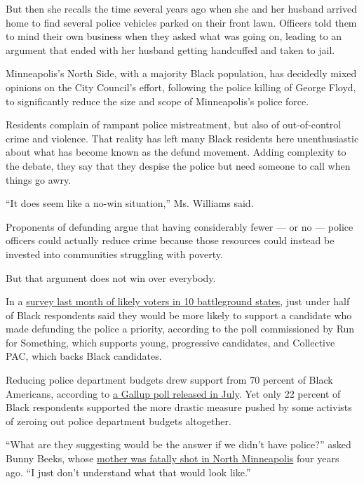 But then she recalls the time several years ago when she and her husband
arrived home to find several police vehicles parked on their front lawn.
Officers told them to mind their own business when they asked what was
going on, leading to an argument that ended with her husband getting
handcuffed and taken to jail.

Minneapolis's North Side, with a majority Black population, has
decidedly mixed opinions on the City Council's effort, following the
police killing of George Floyd, to significantly reduce the size and
scope of Minneapolis's police force.

Residents complain of rampant police mistreatment, but also of
out-of-control crime and violence. That reality has left many Black
residents here unenthusiastic about what has become known as the defund
movement. Adding complexity to the debate, they say that they despise
the police but need someone to call when things go awry.

``It does seem like a no-win situation,'' Ms. Williams said.

Proponents of defunding argue that having considerably fewer --- or no
--- police officers could actually reduce crime because those resources
could instead be invested into communities struggling with poverty.

But that argument does not win over everybody.

In a
\href{https://runforsomething.net/wp-content/uploads/2020/07/PoliceReform_deck-d8.pdf}{survey
last month of likely voters in 10 battleground states}, just under half
of Black respondents said they would be more likely to support a
candidate who made defunding the police a priority, according to the
poll commissioned by Run for Something, which supports young,
progressive candidates, and Collective PAC, which backs Black
candidates.

Reducing police department budgets drew support from 70 percent of Black
Americans, according to
\href{https://news.gallup.com/poll/315962/americans-say-policing-needs-major-changes.aspx}{a
Gallup poll released in July}. Yet only 22 percent of Black respondents
supported the more drastic measure pushed by some activists of zeroing
out police department budgets altogether.

``What are they suggesting would be the answer if we didn't have
police?'' asked Bunny Beeks, whose
\href{https://www.mprnews.org/story/2017/12/19/random-bullet-killed-birdell-beeks-her-daughter-wouldnt-let-her-name-die}{mother
was fatally shot in North Minneapolis} four years ago. ``I just don't
understand what that would look like.''


